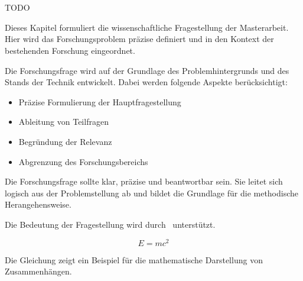 
\chapter{\researchQuestionLabel}\label{cha:researchQuestion}

TODO

Dieses Kapitel formuliert die wissenschaftliche Fragestellung der Masterarbeit.
Hier wird das Forschungsproblem präzise definiert und in den Kontext der bestehenden Forschung eingeordnet.

Die Forschungsfrage wird auf der Grundlage des Problemhintergrunds und des Stands der Technik entwickelt.
Dabei werden folgende Aspekte berücksichtigt:

\begin{itemize}[leftmargin=0.63cm, label=\textbullet]
    \item Präzise Formulierung der Hauptfragestellung
    \item Ableitung von Teilfragen
    \item Begründung der Relevanz
    \item Abgrenzung des Forschungsbereichs
\end{itemize}

Die Forschungsfrage sollte klar, präzise und beantwortbar sein. 
Sie leitet sich logisch aus der Problemstellung ab und bildet die Grundlage für die methodische Herangehensweise.

Die Bedeutung der Fragestellung wird durch~\cite{beispiel2024} unterstützt.

\begin{equation}
\label{eq:beispiel}
E = mc^2
\end{equation}

Die Gleichung zeigt ein Beispiel für die mathematische Darstellung von Zusammenhängen.

